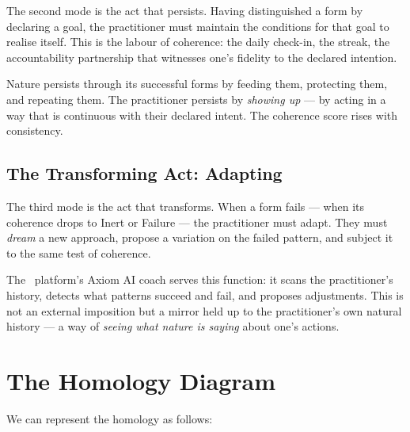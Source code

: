 The second mode is the act that persists. Having distinguished a form by
declaring a goal, the practitioner must maintain the conditions for that goal
to realise itself. This is the labour of coherence: the daily check-in, the
streak, the accountability partnership that witnesses one's fidelity to the
declared intention.

Nature persists through its successful forms by feeding them, protecting them,
and repeating them. The practitioner persists by \emph{showing up} --- by acting
in a way that is continuous with their declared intent. The coherence score
rises with consistency.

\subsection{The Transforming Act: Adapting}

The third mode is the act that transforms. When a form fails --- when its
coherence drops to Inert or Failure --- the practitioner must adapt. They must
\emph{dream} a new approach, propose a variation on the failed pattern, and
subject it to the same test of coherence.

The \praxis\ platform's Axiom AI coach serves this function: it scans the
practitioner's history, detects what patterns succeed and fail, and proposes
adjustments. This is not an external imposition but a mirror held up to the
practitioner's own natural history --- a way of \emph{seeing what nature is
saying} about one's actions.

\section{The Homology Diagram}

We can represent the homology as follows:

